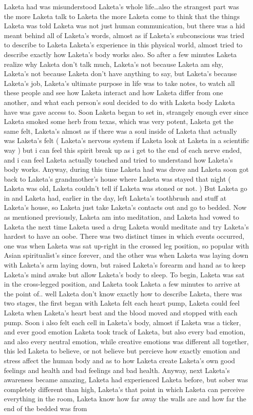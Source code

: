 \documentclass[12pt]{book}
\begin{document}
Laketa had was misunderstood Laketa's whole life\ldots also the strangest part was the more Laketa talk to Laketa the more Laketa come to think that the things Laketa was told Laketa was not just human communication, but there was a hid meant behind all of Laketa's words, almost as if Laketa's subconscious was tried to describe to Laketa Laketa's experience in this physical world, almost tried to describe exactly how Laketa's body works also. So after a few minutes Laketa realize why Laketa don't talk much, Laketa's not because Laketa am shy, Laketa's not because Laketa don't have anything to say, but Laketa's because Laketa's job, Laketa's ultimate purpose in life was to take notes, to watch all these people and see how Laketa interact and how Laketa differ from one another, and what each person's soul decided to do with Laketa body Laketa have was gave access to. Soon Laketa began to set in, strangely enough ever since Laketa smoked some herb from texas, which was very potent, Laketa get the same felt, Laketa's almost as if there was a soul inside of Laketa that actually was Laketa's felt ( Laketa's nervous system if Laketa look at Laketa in a scientific way ) but i can feel this spirit break up as i get to the end of each nerve ended, and i can feel Laketa actually touched and tried to understand how Laketa's body works. Anyway, during this time Laketa had was drove and Laketa soon got back to Laketa's grandmother's house where Laketa was stayed that night ( Laketa was old, Laketa couldn't tell if Laketa was stoned or not. ) But Laketa go in and Laketa had, earlier in the day, left Laketa's toothbrush and stuff at Laketa's house, so Laketa just take Laketa's contacts out and go to bedded. Now as mentioned previously, Laketa am into meditation, and Laketa had vowed to Laketa the next time Laketa used a drug Laketa would meditate and try Laketa's hardest to have an oobe. There was two distinct times in which events occurred, one was when Laketa was sat up-right in the crossed leg position, so popular with Asian spiritualist's since forever, and the other was when Laketa was laying down with Laketa's arm laying down, but raised Laketa's forearm and hand as to keep Laketa's mind awake but allow Laketa's body to sleep. To begin, Laketa was sat in the cross-legged position, and Laketa took Laketa a few minutes to arrive at the point of.. well Laketa don't know exactly how to describe Laketa, there was two stages, the first began with Laketa felt each heart pump, Laketa could feel Laketa when Laketa's heart beat and the blood moved and stopped with each pump. Soon i also felt each cell in Laketa's body, almost if Laketa was a ticker, and ever good emotion Laketa took track of Laketa, but also every bad emotion, and also every neutral emotion, while creative emotions was different all together, this led Laketa to believe, or not believe but percieve how exactly emotion and stress affect the human body and as to how Laketa create Laketa's own good feelings and health and bad feelings and bad health. Anyway, next Laketa's awareness became amazing, Laketa had experienced Laketa before, but sober was completely different than high, Laketa's that point in which Laketa can perceive everything in the room, Laketa know how far away the walls are and how far the end of the bedded was from 
\end{document}
